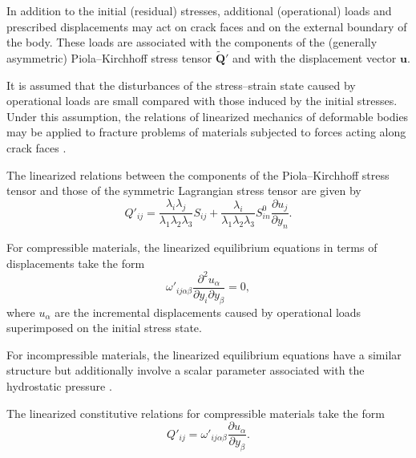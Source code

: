 In addition to the initial (residual) stresses, additional (operational) loads and prescribed displacements may act on crack faces and on the external boundary of the body. These loads are associated with the components of the (generally asymmetric) Piola--Kirchhoff stress tensor $\tilde{\mathbf{Q}}'$ \cite{BogdanovGuz24} and with the displacement vector $\mathbf{u}$.

It is assumed that the disturbances of the stress--strain state caused by operational loads are small compared with those induced by the initial stresses. Under this assumption, the relations of linearized mechanics of deformable bodies may be applied to fracture problems of materials subjected to forces acting along crack faces \cite{BogdanovGuz5,BogdanovGuz28}.

The linearized relations between the components of the Piola--Kirchhoff stress tensor and those of the symmetric Lagrangian stress tensor are given by \cite{BogdanovGuz28}
\[
Q'_{ij}
=
\frac{\lambda_i \lambda_j}{\lambda_1 \lambda_2 \lambda_3} S_{ij}
+
\frac{\lambda_i}{\lambda_1 \lambda_2 \lambda_3}
S^{0}_{in}
\frac{\partial u_j}{\partial y_n}.
\]

For compressible materials, the linearized equilibrium equations in terms of displacements take the form \cite{BogdanovGuz28}
\begin{equation}
	\label{BogdanovGuzEq2}
	\omega'_{ij\alpha\beta}
	\frac{\partial^2 u_\alpha}{\partial y_i \partial y_\beta}
	= 0,
\end{equation}
where $u_\alpha$ are the incremental displacements caused by operational loads superimposed on the initial stress state.

For incompressible materials, the linearized equilibrium equations have a similar structure but additionally involve a scalar parameter associated with the hydrostatic pressure \cite{BogdanovGuz28}.

The linearized constitutive relations for compressible materials take the form \cite{BogdanovGuz28}
\begin{equation}
	\label{BogdanovGuzEq3}
	Q'_{ij}
	=
	\omega'_{ij\alpha\beta}
	\frac{\partial u_\alpha}{\partial y_\beta}.
\end{equation}

